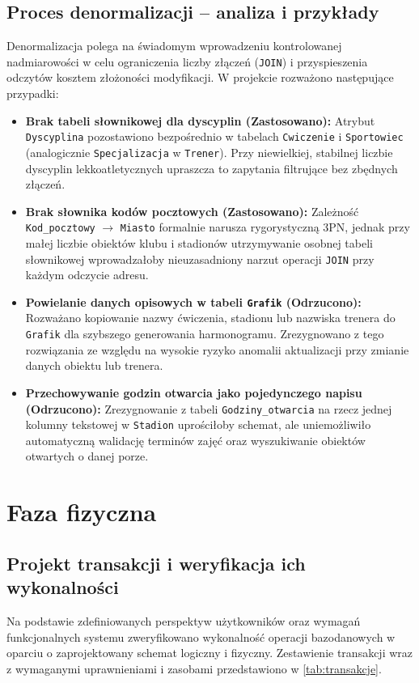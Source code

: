 \documentclass[11pt,a4paper]{article}
\begin{document}
\subsection{Proces denormalizacji -- analiza i przykłady}
Denormalizacja polega na świadomym wprowadzeniu kontrolowanej nadmiarowości w celu ograniczenia liczby złączeń (\texttt{JOIN}) i przyspieszenia odczytów kosztem złożoności modyfikacji. W projekcie rozważono następujące przypadki:
\begin{itemize}
    \item \textbf{Brak tabeli słownikowej dla dyscyplin (Zastosowano):} Atrybut \texttt{Dyscyplina} pozostawiono bezpośrednio w tabelach \texttt{Cwiczenie} i \texttt{Sportowiec} (analogicznie \texttt{Specjalizacja} w \texttt{Trener}). Przy niewielkiej, stabilnej liczbie dyscyplin lekkoatletycznych upraszcza to zapytania filtrujące bez zbędnych złączeń.
    \item \textbf{Brak słownika kodów pocztowych (Zastosowano):} Zależność \texttt{Kod\_pocztowy} $\rightarrow$ \texttt{Miasto} formalnie narusza rygorystyczną 3PN, jednak przy małej liczbie obiektów klubu i stadionów utrzymywanie osobnej tabeli słownikowej wprowadzałoby nieuzasadniony narzut operacji \texttt{JOIN} przy każdym odczycie adresu.
    \item \textbf{Powielanie danych opisowych w tabeli \texttt{Grafik} (Odrzucono):} Rozważano kopiowanie nazwy ćwiczenia, stadionu lub nazwiska trenera do \texttt{Grafik} dla szybszego generowania harmonogramu. Zrezygnowano z tego rozwiązania ze względu na wysokie ryzyko anomalii aktualizacji przy zmianie danych obiektu lub trenera.
    \item \textbf{Przechowywanie godzin otwarcia jako pojedynczego napisu (Odrzucono):} Zrezygnowanie z tabeli \texttt{Godziny\_otwarcia} na rzecz jednej kolumny tekstowej w \texttt{Stadion} uprościłoby schemat, ale uniemożliwiło automatyczną walidację terminów zajęć oraz wyszukiwanie obiektów otwartych o danej porze.
\end{itemize}

\clearpage
\section{Faza fizyczna}

\subsection{Projekt transakcji i weryfikacja ich wykonalności}
Na podstawie zdefiniowanych perspektyw użytkowników oraz wymagań funkcjonalnych systemu zweryfikowano wykonalność operacji bazodanowych w oparciu o zaprojektowany schemat logiczny i fizyczny. Zestawienie transakcji wraz z wymaganymi uprawnieniami i zasobami przedstawiono w \cref{tab:transakcje}.
\end{document}
